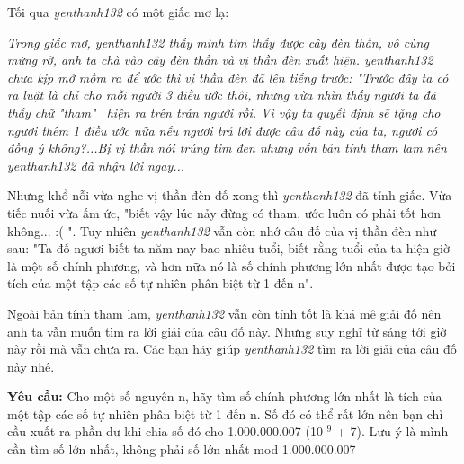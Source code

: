 Tối qua   \emph{    yenthanh132   }   có một giấc mơ lạ:  

\emph{    Trong giấc mơ, yenthanh132 thấy mình tìm thấy được cây đèn thần, vô cùng mừng rỡ, anh ta chà vào cây đèn thần và vị thần đèn xuất hiện. yenthanh132 chưa kịp mở mồm ra để ước thì vị thần đèn đã lên tiếng trước: "Trước đây ta có ra luật là chỉ cho mỗi người 3 điều ước thôi, nhưng vừa nhìn thấy ngươi ta đã thấy chữ "tham"  hiện ra trên trán ngưởi rồi. Vì vậy ta quyết định sẽ tặng cho ngươi thêm 1 điều ước nữa nếu ngươi trả lời được câu đố này của ta, ngươi có đồng ý không?...Bị vị thần nói trúng tim đen nhưng vốn bản tính tham lam nên yenthanh132 đã nhận lời ngay...   }

   Nhưng khổ nỗi vừa nghe vị thần đèn đố xong thì   \emph{    yenthanh132   }   đã tỉnh giấc. Vừa tiếc nuối vừa ấm ức, "biết vậy lúc nảy đừng có tham, ước luôn có phải tốt hơn không... :( ". Tuy nhiên   \emph{    yenthanh132   }   vẫn còn nhớ câu đố của vị thần đèn như sau: "Ta đố ngươi biết ta năm nay bao nhiêu tuổi, biết rằng tuổi của ta hiện giờ là một số chính phương, và hơn nữa nó là số chính phương lớn nhất được tạo bởi tích của một tập các số tự nhiên phân biệt từ 1 đến n".  

   Ngoài bản tính tham lam,   \emph{    yenthanh132   }   vẫn còn tính tốt là khá mê giải đố nên anh ta vẫn muốn tìm ra lời giải của câu đố này. Nhưng suy nghĩ từ sáng tới giờ này rồi mà vẫn chưa ra. Các bạn hãy giúp   \emph{    yenthanh132   }   tìm ra lời giải của câu đố này nhé.  

\textbf{    Yêu cầu:   }   Cho một số nguyên n, hãy tìm số chính phương lớn nhất là tích của một tập các số tự nhiên phân biệt từ 1 đến n. Số đó có thể rất lớn nên bạn chỉ cầu xuất ra phần dư khi chia số đó cho 1.000.000.007 (10   $^    9   $   + 7). Lưu ý là mình cần tìm số lớn nhất, không phải số lớn nhất mod 1.000.000.007